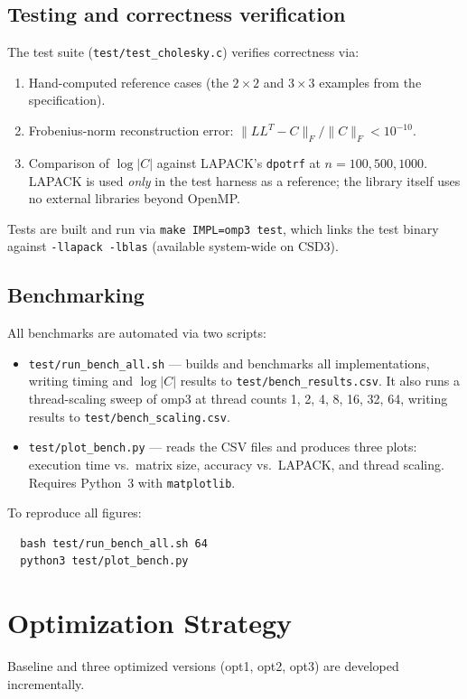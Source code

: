 \documentclass[10pt,leqno]{amsart}
\begin{document}
\subsection{Testing and correctness verification}

The test suite (\texttt{test/test\_cholesky.c}) verifies correctness via:
\begin{enumerate}
  \item Hand-computed reference cases (the $2\times 2$ and $3\times 3$ 
  examples from the specification).
  \item Frobenius-norm reconstruction error: $\|LL^T - C\|_F / \|C\|_F < 10^{-10}$.
  \item Comparison of $\log|C|$ against LAPACK's \texttt{dpotrf} at 
  $n = 100, 500, 1000$. LAPACK is used \emph{only} in the test harness as a 
  reference; the library itself uses no external libraries beyond OpenMP.
\end{enumerate}
Tests are built and run via \texttt{make IMPL=omp3 test}, which links the 
test binary against \texttt{-llapack -lblas} (available system-wide on CSD3).

\subsection{Benchmarking}

All benchmarks are automated via two scripts:
\begin{itemize}
  \item \texttt{test/run\_bench\_all.sh} --- builds and benchmarks all 
  implementations, writing timing and $\log|C|$ results to 
  \texttt{test/bench\_results.csv}.
  It also runs a thread-scaling sweep of omp3 at thread counts 1, 2, 4, 8, 
  16, 32, 64, writing results to \texttt{test/bench\_scaling.csv}.
  \item \texttt{test/plot\_bench.py} --- reads the CSV files and produces 
  three plots: execution time vs.\ matrix size, accuracy vs.\ LAPACK, and 
  thread scaling. Requires Python~3 with \texttt{matplotlib}.
\end{itemize}
To reproduce all figures:
\begin{verbatim}
  bash test/run_bench_all.sh 64
  python3 test/plot_bench.py
\end{verbatim}

\section{Optimization Strategy}
Baseline and three optimized versions (opt1, opt2, opt3) are developed incrementally.
\end{document}
